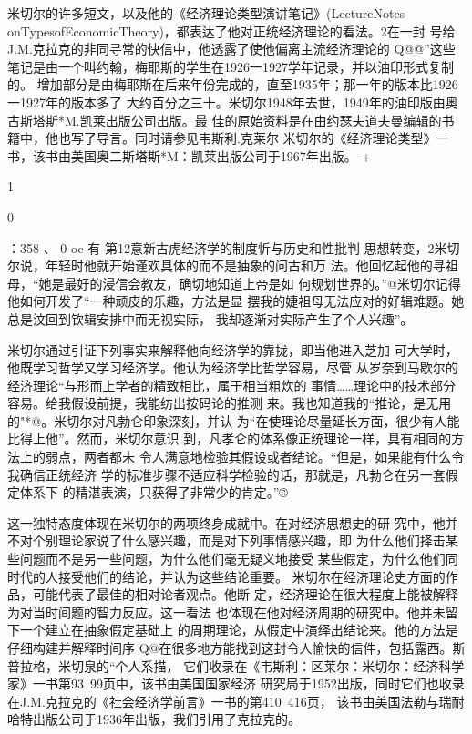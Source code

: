 米切尔的许多短文，以及他的《经济理论类型演讲笔记》(LectureNotes
onTypesofEconomicTheory)，都表达了他对正统经济理论的看法。2在一封
号给J.M.克拉克的非同寻常的快信中，他透露了使他偏离主流经济理论的
Q@@”这些笔记是由一个叫约翰，梅耶斯的学生在1926一1927学年记录，并以油印形式复制的。
增加部分是由梅耶斯在后来年份完成的，直至1935年；那一年的版本比1926一1927年的版本多了
大约百分之三十。米切尔1948年去世，1949年的油印版由奥古斯塔斯*M.凯莱出版公司出版。最
佳的原始资料是在由约瑟夫道夫曼编辑的书籍中，他也写了导言。同时请参见韦斯利.克莱尔
米切尔的《经济理论类型》一书，该书由美国奥二斯塔斯*M：凯莱出版公司于1967年出版。
+

1

0

：358
、
0
oe
有
第12意新古虎经济学的制度忻与历史和性批判
思想转变，2米切尔说，年轻时他就开始谨欢具体的而不是抽象的问古和万
法。他回忆起他的寻祖母，“她是最好的浸信会教友，确切地知道上帝是如
何规划世界的。”@米切尔记得他如何开发了“一种顽皮的乐趣，方法是显
摆我的婕祖母无法应对的好辑难题。她总是汶回到钦辑安排中而无视实际，
我却逐渐对实际产生了个人兴趣”。

米切尔通过引证下列事实来解释他向经济学的靠拢，即当他进入芝加
可大学时，他既学习哲学又学习经济学。他认为经济学比哲学容易，尽管
从岁奈到马歇尔的经济理论“与形而上学者的精致相比，属于相当粗炊的
事情……理论中的技术部分容易。给我假设前提，我能纺出按码论的推测
来。我也知道我的“推论，是无用的"*@。米切尔对凡勃仑印象深刻，并认
为“在使理论尽量延长方面，很少有人能比得上他”。然而，米切尔意识
到，凡孝仑的体系像正统理论一样，具有相同的方法上的弱点，两者都未
令人满意地检验其假设或者结论。“但是，如果能有什么令我确信正统经济
学的标准步骤不适应科学检验的话，那就是，凡勃仑在另一套假定体系下
的精湛表演，只获得了非常少的肯定。”®

这一独特态度体现在米切尔的两项终身成就中。在对经济思想史的研
究中，他并不对个别理论家说了什么感兴趣，而是对下列事情感兴趣，即
为什么他们择击某些问题而不是另一些问题，为什么他们毫无疑义地接受
某些假定，为什么他们同时代的人接受他们的结论，并认为这些结论重要。
米切尔在经济理论史方面的作品，可能代表了最佳的相对论者观点。他断
定，经济理论在很大程度上能被解释为对当时间题的智力反应。这一看法
也体现在他对经济周期的研究中。他并未留下一个建立在抽象假定基础上
的周期理论，从假定中演绎出结论来。他的方法是仔细构建并解释时间序
Q@在很多地方能找到这封令人愉快的信件，包括露西。斯普拉格，米切泉的“个人系描，
它们收录在《韦斯利：区莱尔：米切尔：经济科学家》一书第93~99页中，该书由美国国家经济
研究局于1952出版，同时它们也收录在J.M.克拉克的《社会经济学前言》一书的第410~416页，
该书由美国法勒与瑞耐哈特出版公司于1936年出版，我们引用了克拉克的。


